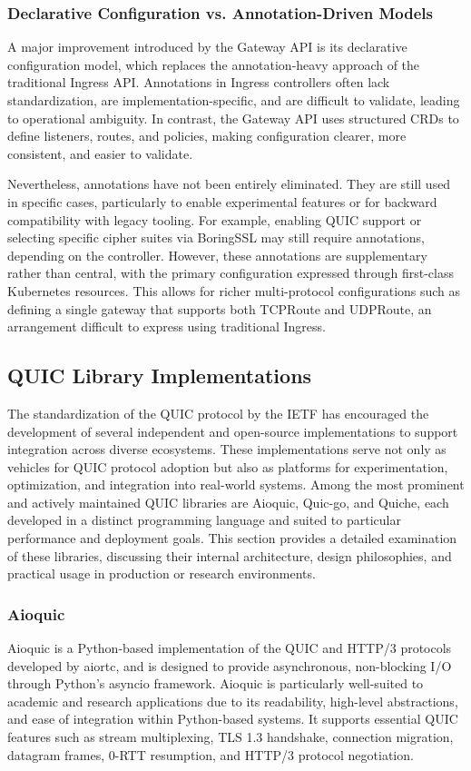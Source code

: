 \subsubsection{Declarative Configuration vs. Annotation-Driven Models}
A major improvement introduced by the Gateway API is its declarative configuration model, which replaces the annotation-heavy approach of the traditional Ingress API. Annotations in Ingress controllers often lack standardization, are implementation-specific, and are difficult to validate, leading to operational ambiguity. In contrast, the Gateway API uses structured CRDs to define listeners, routes, and policies, making configuration clearer, more consistent, and easier to validate.

Nevertheless, annotations have not been entirely eliminated. They are still used in specific cases, particularly to enable experimental features or for backward compatibility with legacy tooling. For example, enabling QUIC support or selecting specific cipher suites via BoringSSL may still require annotations, depending on the controller. However, these annotations are supplementary rather than central, with the primary configuration expressed through first-class Kubernetes resources. This allows for richer multi-protocol configurations such as defining a single gateway that supports both TCPRoute and UDPRoute, an arrangement difficult to express using traditional Ingress.


\subsection{QUIC Library Implementations}
The standardization of the QUIC protocol by the IETF has encouraged the development of several independent and open-source implementations to support integration across diverse ecosystems. These implementations serve not only as vehicles for QUIC protocol adoption but also as platforms for experimentation, optimization, and integration into real-world systems. Among the most prominent and actively maintained QUIC libraries are Aioquic, Quic-go, and Quiche, each developed in a distinct programming language and suited to particular performance and deployment goals. This section provides a detailed examination of these libraries, discussing their internal architecture, design philosophies, and practical usage in production or research environments.

\subsubsection{Aioquic}
Aioquic is a Python-based implementation of the QUIC and HTTP/3 protocols developed by aiortc, and is designed to provide asynchronous, non-blocking I/O through Python's asyncio framework. Aioquic is particularly well-suited to academic and research applications due to its readability, high-level abstractions, and ease of integration within Python-based systems. It supports essential QUIC features such as stream multiplexing, TLS 1.3 handshake, connection migration, datagram frames, 0-RTT resumption, and HTTP/3 protocol negotiation.

